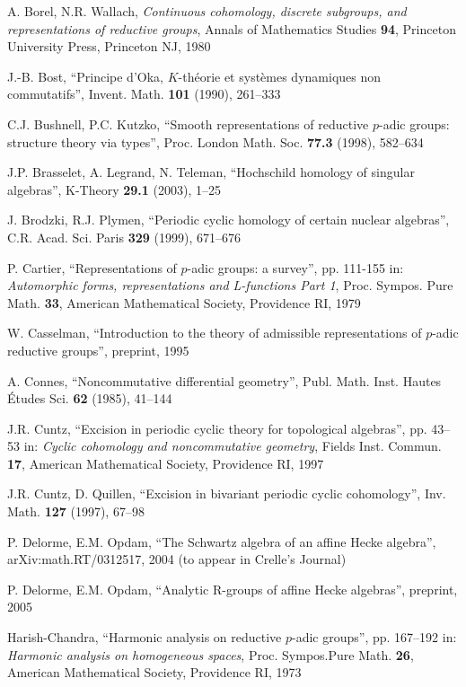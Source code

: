 \documentclass[11pt]{report}
\begin{document}
\begin{thebibliography}{99}
 A. Borel, N.R. Wallach,
\emph{Continuous cohomology, discrete subgroups, and
representations of reductive groups}, Annals of Mathematics
Studies \textbf{94}, Princeton University Press, Princeton NJ, 1980

 J.-B. Bost,
``Principe d'Oka, $K$-th\'eorie et syst\`emes dynamiques non commutatifs'',
Invent. Math. \textbf{101} (1990), 261--333

 C.J. Bushnell, P.C. Kutzko,
``Smooth representations of reductive $p$-adic groups: structure
theory via types'', Proc. London Math. Soc. \textbf{77.3} (1998),
582--634

 J.P. Brasselet, A. Legrand, N. Teleman,
``Hochschild homology of singular algebras'',
K-Theory \textbf{29.1} (2003), 1--25

 J. Brodzki, R.J. Plymen,
``Periodic cyclic homology of certain nuclear algebras'',
C.R. Acad. Sci. Paris \textbf{329} (1999), 671--676

 P. Cartier,
``Representations of $p$-adic groups: a survey'', pp. 111-155 in:
\emph{Automorphic forms, representations and L-functions Part 1},
Proc. Sympos. Pure Math. \textbf{33}, American Mathematical
Society, Providence RI, 1979

 W. Casselman,	
``Introduction to the theory of admissible representations
of $p$-adic reductive groups'',
preprint, 1995

 A. Connes,
``Noncommutative differential geometry'',
Publ. Math. Inst. Hautes \'Etudes Sci. \textbf{62} (1985), 41--144

 J.R. Cuntz,
``Excision in periodic cyclic theory for topological algebras'',
pp. 43--53 in: \emph{Cyclic cohomology and noncommutative geometry},
Fields Inst. Commun. \textbf{17},
American Mathematical Society, Providence RI, 1997

 J.R. Cuntz, D. Quillen,
``Excision in bivariant periodic cyclic cohomology'',
Inv. Math. \textbf{127} (1997), 67--98

 P. Delorme, E.M. Opdam,
``The Schwartz algebra of an affine Hecke algebra'',
arXiv:math.RT/0312517, 2004 (to appear in Crelle's Journal)

 P. Delorme, E.M. Opdam,
``Analytic R-groups of affine Hecke algebras'', preprint, 2005

 Harish-Chandra,
``Harmonic analysis on reductive $p$-adic groups'', pp. 167--192
in: \emph{Harmonic analysis on homogeneous spaces},
Proc. Sympos.Pure Math. \textbf{26}, 
American Mathematical Society, Providence RI, 1973


\end{thebibliography}
\end{document}
